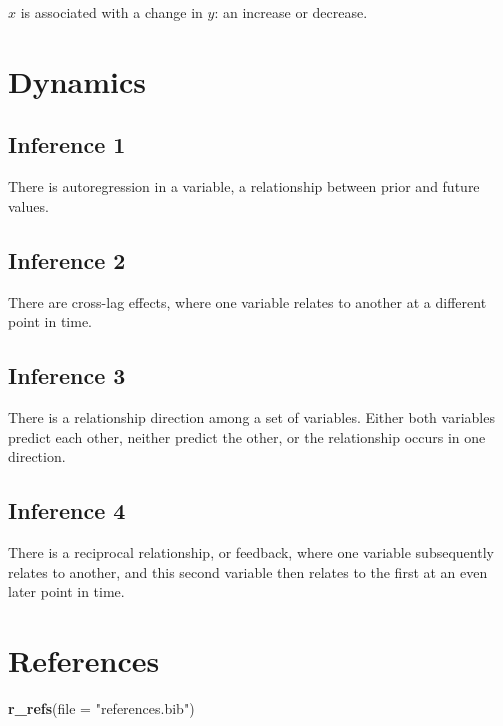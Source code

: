 \documentclass[english,,man]{apa6}
\newenvironment{Shaded}{\begin{snugshade}}{\end{snugshade}}
\newcommand{\DataTypeTok}[1]{\textcolor[rgb]{0.13,0.29,0.53}{#1}}
\newcommand{\KeywordTok}[1]{\textcolor[rgb]{0.13,0.29,0.53}{\textbf{#1}}}
\newcommand{\NormalTok}[1]{#1}
\newcommand{\StringTok}[1]{\textcolor[rgb]{0.31,0.60,0.02}{#1}}
\theoremstyle{definition}
\theoremstyle{definition}
\theoremstyle{definition}
\theoremstyle{remark}
\begin{document}
\(x\) is associated with a change in \(y\): an increase or decrease.

\hypertarget{dynamics-1}{%
\section{Dynamics}\label{dynamics-1}}

\hypertarget{inference-1-8}{%
\subsection{Inference 1}\label{inference-1-8}}

There is autoregression in a variable, a relationship between prior and
future values.

\hypertarget{inference-2-5}{%
\subsection{Inference 2}\label{inference-2-5}}

There are cross-lag effects, where one variable relates to another at a
different point in time.

\hypertarget{inference-3-3}{%
\subsection{Inference 3}\label{inference-3-3}}

There is a relationship direction among a set of variables. Either both
variables predict each other, neither predict the other, or the
relationship occurs in one direction.

\hypertarget{inference-4-3}{%
\subsection{Inference 4}\label{inference-4-3}}

There is a reciprocal relationship, or feedback, where one variable
subsequently relates to another, and this second variable then relates
to the first at an even later point in time.

\newpage

\hypertarget{references}{%
\section{References}\label{references}}

\begin{Shaded}
\begin{Highlighting}[]
\KeywordTok{r_refs}\NormalTok{(}\DataTypeTok{file =} \StringTok{"references.bib"}\NormalTok{)}
\end{Highlighting}
\end{Shaded}
\end{document}
